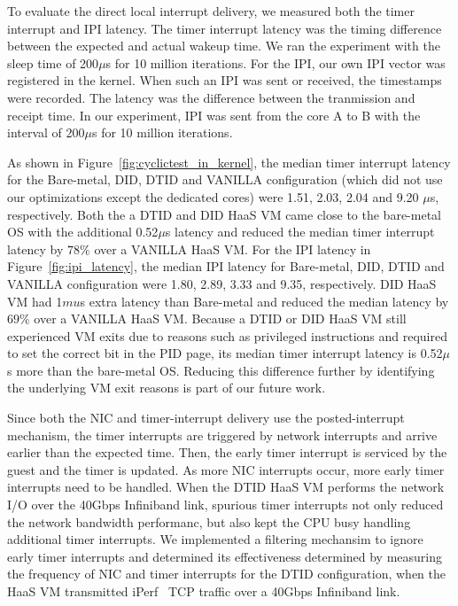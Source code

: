 To evaluate the direct local interrupt delivery, we measured
both the timer interrupt and IPI latency. The timer interrupt
latency was the timing difference between the expected and
actual wakeup time. We ran the experiment with the sleep time
of 200$\mu$s for 10 million iterations. For the IPI, our own
IPI vector was registered in the kernel. When such an IPI was
sent or received, the timestamps were recorded. The latency
was the difference between the tranmission and receipt time.
In our experiment, IPI was sent from the core A to B with the
interval of 200$\mu$s for 10 million iterations.

As shown in Figure~\ref{fig:cyclictest_in_kernel}, the median
timer interrupt latency for the Bare-metal, DID, DTID and
VANILLA configuration (which did not use our optimizations
except the dedicated cores) were 1.51, 2.03, 2.04 and 9.20
$\mu$s, respectively. Both the a DTID and DID HaaS VM came
close to the bare-metal OS with the additional 0.52$\mu$s
latency and reduced the median timer interrupt latency by
$78\%$ over a VANILLA HaaS VM. For the IPI latency in
Figure~\ref{fig:ipi_latency}, the median IPI latency for
Bare-metal, DID, DTID and VANILLA configuration were 1.80,
2.89, 3.33 and 9.35, respectively. DID HaaS VM had 1$mu$s
extra latency than Bare-metal and reduced the median latency
by $69\%$ over a VANILLA HaaS VM. Because a DTID or DID HaaS
VM still experienced VM exits due to reasons such as
privileged instructions and required to set the correct bit in
the PID page, its median timer interrupt latency is 0.52$\mu$s
more than the bare-metal OS. Reducing this difference further
by identifying the underlying VM exit reasons is part of our
future work.

Since both the NIC and timer-interrupt delivery use the
posted-interrupt mechanism, the timer
interrupts are triggered by network interrupts and arrive
earlier than the expected time. Then, the early timer
interrupt is serviced by the guest and the timer is updated. 
As more NIC interrupts occur, more early timer
interrupts need to be handled. When the DTID HaaS VM
performs the network I/O over the 40Gbps Infiniband link,
spurious timer interrupts not only reduced the network
bandwidth performanc, but also kept the CPU busy handling
additional timer interrupts. We implemented a filtering mechansim 
to ignore early timer interrupts and determined its 
effectiveness determined by measuring the frequency of NIC
and timer interrupts for the DTID configuration, when the HaaS VM 
transmitted iPerf~\cite{iperf} TCP traffic over a 40Gbps Infiniband link.

